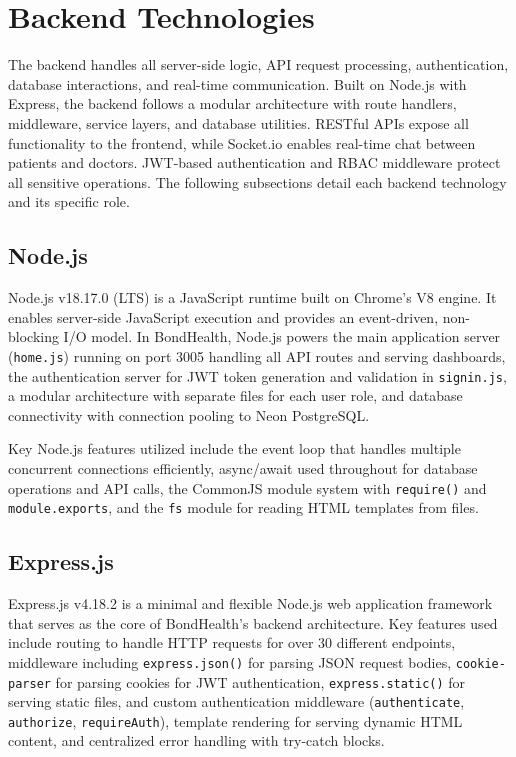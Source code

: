 \section{Backend Technologies}

\justifying
\noindent The backend handles all server-side logic, API request processing, authentication, database interactions, and real-time communication. Built on Node.js with Express, the backend follows a modular architecture with route handlers, middleware, service layers, and database utilities. RESTful APIs expose all functionality to the frontend, while Socket.io enables real-time chat between patients and doctors. JWT-based authentication and RBAC middleware protect all sensitive operations. The following subsections detail each backend technology and its specific role.

\subsection{Node.js}

\justifying
\noindent Node.js v18.17.0 (LTS) is a JavaScript runtime built on Chrome's V8 engine. It enables server-side JavaScript execution and provides an event-driven, non-blocking I/O model. In BondHealth, Node.js powers the main application server (\texttt{home.js}) running on port 3005 handling all API routes and serving dashboards, the authentication server for JWT token generation and validation in \texttt{signin.js}, a modular architecture with separate files for each user role, and database connectivity with connection pooling to Neon PostgreSQL.

\justifying
\noindent Key Node.js features utilized include the event loop that handles multiple concurrent connections efficiently, async/await used throughout for database operations and API calls, the CommonJS module system with \texttt{require()} and \texttt{module.exports}, and the \texttt{fs} module for reading HTML templates from files.

\subsection{Express.js}

\justifying
\noindent Express.js v4.18.2 is a minimal and flexible Node.js web application framework that serves as the core of BondHealth's backend architecture. Key features used include routing to handle HTTP requests for over 30 different endpoints, middleware including \texttt{express.json()} for parsing JSON request bodies, \texttt{cookie-parser} for parsing cookies for JWT authentication, \texttt{express.static()} for serving static files, and custom authentication middleware (\texttt{authenticate}, \texttt{authorize}, \texttt{requireAuth}), template rendering for serving dynamic HTML content, and centralized error handling with try-catch blocks.

